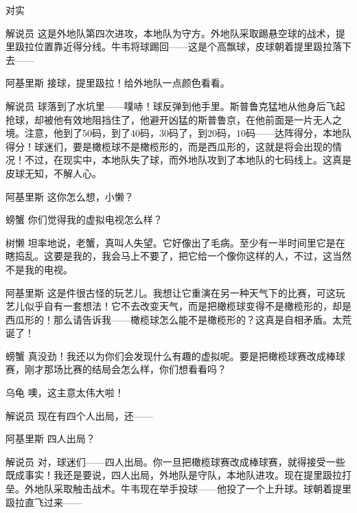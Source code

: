 \begin{dialog}{对实}
\begin{dialogue}
\item[解说员]这是外地队第四次进攻，本地队为守方。外地队采取踢悬空球的战术，提里趿拉位置靠近得分线。牛韦将球踢回——这是个高飘球，皮球朝着提里趿拉落下去——

\item[阿基里斯]接球，提里趿拉！给外地队一点颜色看看。

\item[解说员]球落到了水坑里——噗哧！球反弹到他手里。斯普鲁克猛地从他身后飞起抢球，却被他有效地阻挡住了，他避开凶猛的斯普鲁京，在他前面是一片无人之境。注意，他到了$50$码，到了$40$码，$30$码了，到$20$码，$10$码——达阵得分，本地队得分！球迷们，要是橄榄球不是橄榄形的，而是西瓜形的，这就是将会出现的情况！不过，在现实中，本地队失了球，而外地队攻到了本地队的七码线上。这真是皮球无知，不解人心。

\item[阿基里斯]这你怎么想，小懒？


\item[螃蟹]你们觉得我的虚拟电视怎么样？

\item[树懒]坦率地说，老蟹，真叫人失望。它好像出了毛病。至少有一半时间里它是在瞎捣乱。这要是我的，我会马上不要了，把它给一个像你这样的人，不过，这当然不是我的电视。

\item[阿基里斯]这是件很古怪的玩艺儿。我想让它重演在另一种天气下的比赛，可这玩艺儿似乎自有一套想法！它不去改变天气，而是把橄榄球变得不是橄榄形的，却是西瓜形的！那么请告诉我——橄榄球怎么能不是橄榄形的？这真是自相矛盾。太荒诞了！

\item[螃蟹]真没劲！我还以为你们会发现什么有趣的虚拟呢。要是把橄榄球赛改成棒球赛，刚才那场比赛的结局会怎么样，你们想看看吗？

\item[乌龟]噢，这主意太伟大啦！


\item[解说员]现在有四个人出局，还——

\item[阿基里斯]四人出局？

\item[解说员]对，球迷们——四人出局。你一旦把橄榄球赛改成棒球赛，就得接受一些既成事实！我还是要说，四人出局，外地队是守队，本地队进攻。现在提里趿拉打垒。外地队采取触击战术。牛韦现在举手投球——他投了一个上升球。球朝着提里趿拉直飞过来——


\end{dialogue}
\end{dialog}
